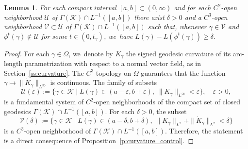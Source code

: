 \documentclass[11pt]{article}
\let\sep\mid
\let\epsilon\varepsilon
\newcommand{\KK}{\mathcal{K}}
\newcommand{\UU}{\mathcal{U}}
\newcommand{\VV}{\mathcal{V}}
\theoremstyle{plain}
\newtheorem{Lemma}[Thm]{Lemma}
\theoremstyle{definition}
\begin{document}
\begin{Lemma}\label{l:encapsulated_nbhds}
For each compact interval $[a,b]\subset(0,\infty)$ and for each $C^2$-open neighborhood $\UU$ of $\Gamma(\KK)\cap L^{-1}([a,b])$ there exist $\delta>0$ and a $C^3$-open neighborhood $\VV\subset\UU$ of $\Gamma(\KK)\cap L^{-1}([a,b])$ such that, whenever $\gamma\in\VV$ and $\phi^t(\gamma)\not\in\UU$ for some $t\in(0,t_\gamma)$, we~have $L(\gamma)-L(\phi^t(\gamma))\geq\delta$.
\end{Lemma}

\begin{proof}
For each $\gamma\in\Omega$, we~denote by $K_\gamma$ the signed geodesic curvature of its arc-length parametrization with respect to a normal vector field, as in Section~\ref{ss:curvature}.
The $C^3$ topology on $\Omega$ guarantees that the function $\gamma\mapsto\|\dot K_\gamma\|_{L^\infty}$ is continuous.
The family of subsets
\[
\UU(\epsilon):=\big\{ \gamma\in\KK\sep L(\gamma)\in(a-\epsilon,b+\epsilon),\; \|K_\gamma\|_{L^\infty}<\epsilon \big\},\quad \epsilon>0,
\]
is a fundamental system of $C^2$-open neighborhoods of the compact set of closed geodesics $\Gamma(\KK)\cap L^{-1}([a,b])$. For each $\delta>0$, the subset
\[
\VV(\delta):=\big\{ \gamma\in\KK\sep L(\gamma)\in(a-\delta,b+\delta),\; \|K_\gamma\|_{L^2}+\|\dot K_\gamma\|_{L^2}<\delta \big\}
\]
is a $C^3$-open neighborhood of $\Gamma(\KK)\cap L^{-1}([a,b])$. Therefore, the statement is a direct consequence of Proposition~\ref{p:curvature_control}.
\end{proof}
\end{document}
